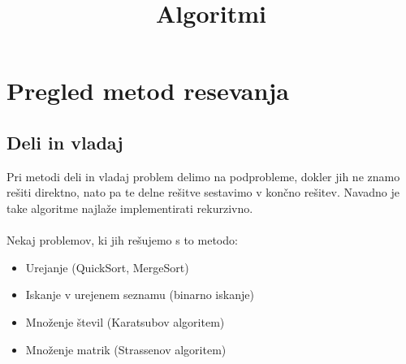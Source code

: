 \documentclass[10pt,a4paper,oneside]{book}
\title{Algoritmi}
\newenvironment{items}{
\begin{itemize}
  \setlength{\itemsep}{1pt}
  \setlength{\parskip}{0pt}
  \setlength{\parsep}{0pt}
}{\end{itemize}}
\begin{document}

\chapter{Pregled metod resevanja}
\section{Deli in vladaj}
Pri metodi deli in vladaj problem delimo na podprobleme, dokler jih ne znamo rešiti direktno, nato pa te delne rešitve sestavimo v končno rešitev. Navadno je take algoritme najlaže implementirati rekurzivno.\\
 \\
Nekaj problemov, ki jih rešujemo s to metodo:
\begin{items}
	\item Urejanje (QuickSort, MergeSort)
	\item Iskanje v urejenem seznamu (binarno iskanje)
	\item Množenje števil (Karatsubov algoritem)
	\item Množenje matrik (Strassenov algoritem)
\end{items}
\end{document}
